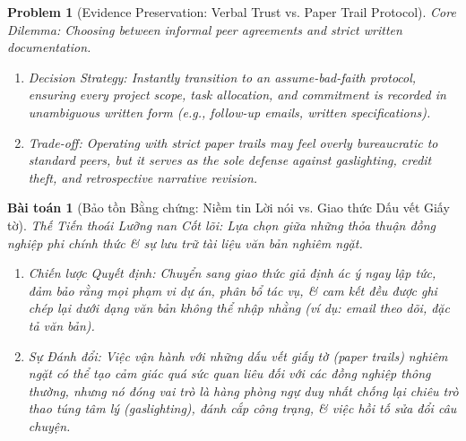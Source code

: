 \documentclass{article}
\newtheorem{problem}{Problem}
\newtheorem{baitoan}{Bài toán}
\begin{document}
\begin{problem}[Evidence Preservation: Verbal Trust vs. Paper Trail Protocol]
	\emph{Core Dilemma:} Choosing between informal peer agreements and strict written documentation.
	\begin{enumerate}[label=(\roman*)]
		\item \emph{Decision Strategy:} Instantly transition to an \textit{assume-bad-faith protocol}, ensuring every project scope, task allocation, and commitment is recorded in unambiguous written form (e.g., follow-up emails, written specifications).
		\item \emph{Trade-off:} Operating with strict paper trails may feel overly bureaucratic to standard peers, but it serves as the sole defense against gaslighting, credit theft, and retrospective narrative revision.
	\end{enumerate}
\end{problem}
\begin{baitoan}[Bảo tồn Bằng chứng: Niềm tin Lời nói vs. Giao thức Dấu vết Giấy tờ]
	\emph{Thế Tiến thoái Lưỡng nan Cốt lõi:} Lựa chọn giữa những thỏa thuận đồng nghiệp phi chính thức \& sự lưu trữ tài liệu văn bản nghiêm ngặt.
	\begin{enumerate}[label=(\roman*)]
		\item \emph{Chiến lược Quyết định:} Chuyển sang \textit{giao thức giả định ác ý} ngay lập tức, đảm bảo rằng mọi phạm vi dự án, phân bổ tác vụ, \& cam kết đều được ghi chép lại dưới dạng văn bản không thể nhập nhằng (ví dụ: email theo dõi, đặc tả văn bản).
		\item \emph{Sự Đánh đổi:} Việc vận hành với những dấu vết giấy tờ (paper trails) nghiêm ngặt có thể tạo cảm giác quá sức quan liêu đối với các đồng nghiệp thông thường, nhưng nó đóng vai trò là hàng phòng ngự duy nhất chống lại chiêu trò thao túng tâm lý (gaslighting), đánh cắp công trạng, \& việc hồi tố sửa đổi câu chuyện.
	\end{enumerate}
\end{baitoan}
\end{document}
